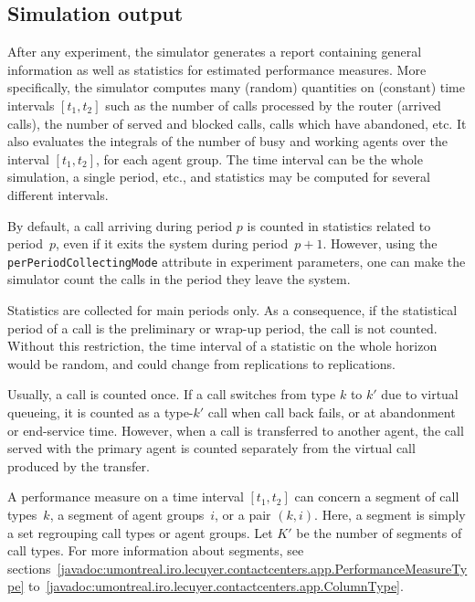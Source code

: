 \subsection{Simulation output}
\label{sec:mskoutputintro}

After any experiment, the simulator generates a report containing
general information as well as statistics for estimated
performance measures.
More specifically,
the simulator computes many (random) quantities
on (constant) time intervals $[t_1, t_2]$ such as
the
number of calls processed by the router (arrived calls), the number of
served and
blocked calls, calls which have abandoned, etc.
It also evaluates the integrals of
the number of busy and working agents over the interval $[t_1, t_2]$,
for each agent group.
The time interval can be the whole simulation, a single period, etc.,
and statistics may be computed for several different intervals.

By default, a call arriving during period $p$ is counted in statistics
related to period~$p$, even if it exits the system during period~$p+1$.
However,
using the \texttt{per\-Period\-Collecting\-Mode} attribute in
experiment parameters, one can make the simulator count the calls in
the period they leave the system.

Statistics are collected for main periods only.
As a consequence,
if the statistical period of a call is the preliminary or wrap-up
period, the call is not counted.
Without this restriction, the time interval of a statistic on the
whole horizon would be random, and could change from replications to
replications.

Usually, a call is counted once.
If a call switches from type $k$ to $k'$ due to virtual queueing, it
is counted as a type-$k'$ call when call back fails, or at abandonment
or end-service time.
However, when a call is transferred to another agent, the call served
with the primary agent is counted separately from the virtual call
produced by the transfer.

A performance measure on a time interval $[t_1, t_2]$
can concern a segment of call types~$k$, a segment
of agent groups~$i$, or a pair $(k, i)$.
Here, a segment is simply a set regrouping call types or agent groups.
Let $K'$ be the number of
segments of call types.
For more information about segments,
see
sections~\ref{javadoc:umontreal.iro.lecuyer.contactcenters.app.PerformanceMeasureType}
to~\ref{javadoc:umontreal.iro.lecuyer.contactcenters.app.ColumnType}.

